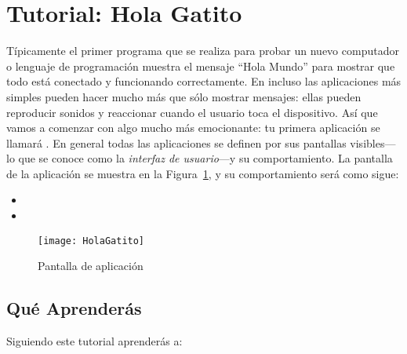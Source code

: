 \section{Tutorial: Hola Gatito}
\label{sec:tutor-hola-gatito}

Típicamente el primer programa que se realiza para probar un nuevo computador o lenguaje de programación muestra el mensaje ``Hola Mundo'' para mostrar que todo está conectado y funcionando correctamente. En \AppInventor incluso las aplicaciones más simples pueden hacer mucho más que sólo mostrar mensajes: ellas pueden reproducir sonidos y reaccionar cuando el usuario toca el dispositivo. Así que vamos a comenzar con algo mucho más emocionante: tu primera aplicación se llamará . En general todas las aplicaciones se definen por sus pantallas visibles---lo que se conoce como la \textit{interfaz de usuario}---y su comportamiento. La pantalla de la aplicación se muestra en la Figura~\ref{fig:holaGatito}, y su comportamiento será como sigue:

\begin{itemize}
\item {}
\item {}
\end{itemize}

\begin{figure}[H]
  \centering
  \texttt{[image: HolaGatito]}
  \caption{Pantalla de aplicación }
  \label{fig:holaGatito}
\end{figure}

\subsection*{Qué Aprenderás}

Siguiendo este tutorial aprenderás a:

